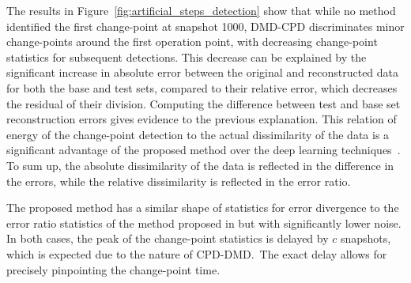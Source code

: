 The results in Figure~\ref{fig:artificial_steps_detection} show that while no method identified the first change-point at snapshot 1000, DMD-CPD discriminates minor change-points around the first operation point, with decreasing change-point statistics for subsequent detections. This decrease can be explained by the significant increase in absolute error between the original and reconstructed data for both the base and test sets, compared to their relative error, which decreases the residual of their division. Computing the difference between test and base set reconstruction errors gives evidence to the previous explanation. This relation of energy of the change-point detection to the actual dissimilarity of the data is a significant advantage of the proposed method over the deep learning techniques~\citep{DeRyck2021}. To sum up, the absolute dissimilarity of the data is reflected in the difference in the errors, while the relative dissimilarity is reflected in the error ratio.

The proposed method has a similar shape of statistics for error divergence to the error ratio statistics of the method proposed in \citet{Kawahara2007} but with significantly lower noise. In both cases, the peak of the change-point statistics is delayed by \(c\) snapshots, which is expected due to the nature of CPD-DMD.~The exact delay allows for precisely pinpointing the change-point time.

